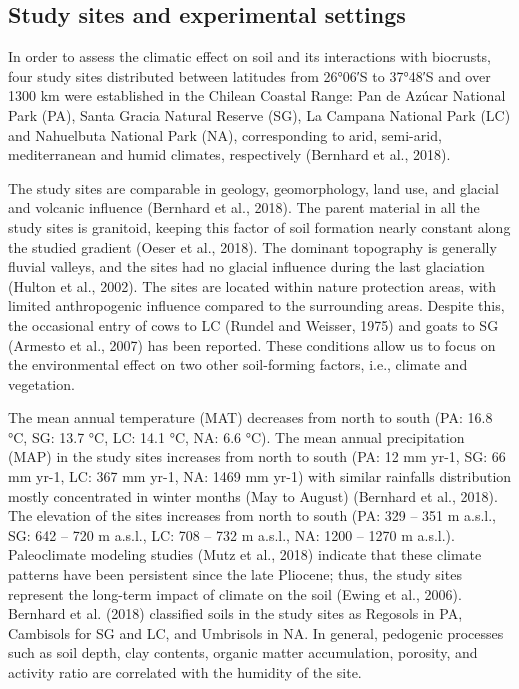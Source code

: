 \subsection{Study sites and experimental settings}

In order to assess the climatic effect on soil and its interactions with biocrusts, four study sites distributed between latitudes from \ang{26;06}S to \ang{37;48}S and over 1300 km were established in the Chilean Coastal Range: Pan de Azúcar National Park (PA), Santa Gracia Natural Reserve (SG), La Campana National Park (LC) and Nahuelbuta National Park (NA), corresponding to arid, semi-arid, mediterranean and humid climates, respectively (Bernhard et al., 2018).

The study sites are comparable in geology, geomorphology, land use, and glacial and volcanic influence (Bernhard et al., 2018). The parent material in all the study sites is granitoid, keeping this factor of soil formation nearly constant along the studied gradient (Oeser et al., 2018). The dominant topography is generally fluvial valleys, and the sites had no glacial influence during the last glaciation (Hulton et al., 2002). The sites are located within nature protection areas, with limited anthropogenic influence compared to the surrounding areas. Despite this, the occasional entry of cows to LC (Rundel and Weisser, 1975) and goats to SG (Armesto et al., 2007) has been reported. These conditions allow us to focus on the environmental effect on two other soil-forming factors, i.e., climate and vegetation.

The mean annual temperature (MAT) decreases from north to south (PA: 16.8 °C, SG: 13.7 °C, LC: 14.1 °C, NA: 6.6 °C). The mean annual precipitation (MAP) in the study sites increases from north to south (PA: 12 mm yr-1, SG: 66 mm yr-1, LC: 367 mm yr-1, NA: 1469 mm yr-1) with similar rainfalls distribution mostly concentrated in winter months (May to August) (Bernhard et al., 2018). The elevation of the sites increases from north to south (PA: 329 – 351 m a.s.l., SG: 642 – 720 m a.s.l., LC: 708 – 732 m a.s.l., NA: 1200 – 1270 m a.s.l.). Paleoclimate modeling studies (Mutz et al., 2018) indicate that these climate patterns have been persistent since the late Pliocene; thus, the study sites represent the long-term impact of climate on the soil (Ewing et al., 2006). Bernhard et al. (2018) classified soils in the study sites as Regosols in PA, Cambisols for SG and LC, and Umbrisols in NA. In general, pedogenic processes such as soil depth, clay contents, organic matter accumulation, porosity, and activity ratio are correlated with the humidity of the site.

